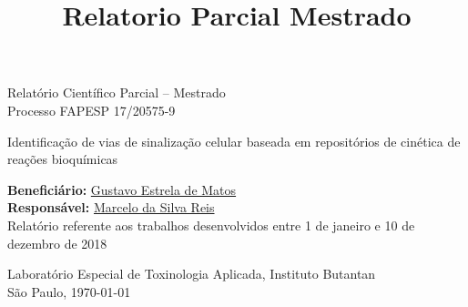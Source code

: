 \documentclass[12pt]{article}
\title{Relatorio Parcial Mestrado}
\begin{document}
%
\doublespacing

\begin{titlepage}
    \vfill 
    \begin{center}
        {\Large Relatório Científico Parcial -- Mestrado\\
         \bigskip
         Processo FAPESP 17/20575-9
        }
        
        \bigskip
        \bigskip
    
        {\LARGE Identificação de vias de sinalização celular baseada em repositórios de cinética de reações bioquímicas}

        \bigskip
        \bigskip
        {\Large {\bf Beneficiário:} \href{mailto:gustavo.estrela.matos@usp.br}{Gustavo Estrela de Matos}\\ 
        
        {\bf Responsável:} \href{mailto:marcelo.reis@butantan.gov.br}{Marcelo da Silva Reis}\\

        \bigskip
        \bigskip
        \bigskip
        \bigskip
        \bigskip
        \bigskip
        \bigskip
Relatório referente aos trabalhos desenvolvidos entre 1 de janeiro e 10 de dezembro de 2018

        \bigskip
        \bigskip
        \bigskip
        \bigskip
        \bigskip
        \bigskip
        \bigskip

Laboratório Especial de Toxinologia Aplicada, Instituto Butantan\\
        \bigskip
        São Paulo, \today\\
        }

        \bigskip
        \bigskip

       

\end{center}
\end{titlepage}


\tableofcontents

\pagebreak
\end{document}

